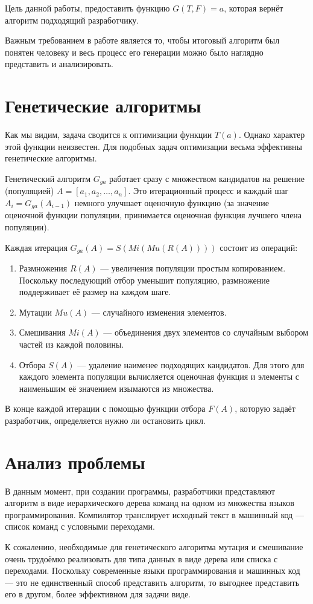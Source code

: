 \documentclass[a4paper,14pt]{extarticle}
\begin{document}
Цель данной работы, предоставить функцию $G(T, F) = a$, которая вернёт алгоритм подходящий разработчику.

Важным требованием в работе является то, чтобы итоговый алгоритм был понятен
человеку и весь процесс его генерации можно было наглядно представить и
анализировать.

\newpage
\section{Генетические алгоритмы}
Как мы видим, задача сводится к оптимизации функции $T(a)$. Однако характер этой
функции неизвестен. Для подобных задач оптимизации весьма
эффективны генетические алгоритмы.

Генетический алгоритм $G_{ga}$ работает сразу с множеством кандидатов на решение
(популяцией) $A = [a_1, a_2, …, a_n]$. Это итерационный процесс и каждый шаг
$A_i = G_{ga}(A_{i-1})$ немного улучшает оценочную функцию (за значение
оценочной функции популяции, принимается оценочная функция лучшего члена
популяции).

Каждая итерация $G_{ga}(A) = S(Mi(Mu(R(A))))$ состоит из операций:
\begin{enumerate}
  \item Размножения $R(A)$ — увеличения популяции простым копированием.
        Поскольку последующий отбор уменьшит популяцию, размножение поддерживает
        её размер на каждом шаге.
  \item Мутации $Mu(A)$ — случайного изменения элементов.
  \item Смешивания $Mi(A)$ — объединения двух элементов со случайным выбором
        частей из каждой половины.
  \item Отбора $S(A)$ — удаление наименее подходящих кандидатов. Для этого для
        каждого элемента популяции вычисляется оценочная функция и элементы с
        наименьшим её значением изымаются из множества.
\end{enumerate}

В конце каждой итерации с помощью функции отбора $F(A)$, которую задаёт
разработчик, определяется нужно ли остановить цикл.

\newpage
\section{Анализ проблемы}
В данным момент, при создании программы, разработчики представляют алгоритм в
виде иерархического дерева команд на одном из множества языков программирования.
Компилятор транслирует исходный текст в машинный код — список команд с условными
переходами.

К сожалению, необходимые для генетического алгоритма мутация и смешивание очень
трудоёмко реализовать для типа данных в виде дерева или списка с переходами.
Поскольку современные языки программирования и машинных код — это не
единственный способ представить алгоритм, то выгоднее представить его в другом,
более эффективном для задачи виде.
\end{document}

